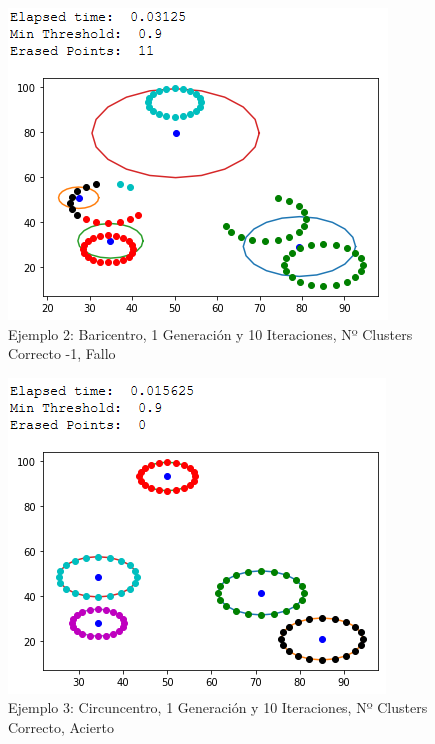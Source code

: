 \documentclass[conference,a4paper]{IEEEtran}
\begin{document}
\begin{figure}[H]
\centering
\includegraphics[scale=0.65]{Experimentacion/Ejemplo3/ej3_b_1_10_lc_wrong}
\caption{Ejemplo 2: Baricentro, 1 Generación y 10 Iteraciones,  Nº Clusters Correcto -1, Fallo\\}
\end{figure}

\begin{figure}[H]
\centering
\includegraphics[scale=0.65]{Experimentacion/Ejemplo3/ej3_c_1_10_cc_correct}
\caption{Ejemplo 3: Circuncentro, 1 Generación y 10 Iteraciones,  Nº Clusters Correcto, Acierto\\}
\end{figure}
\end{document}

